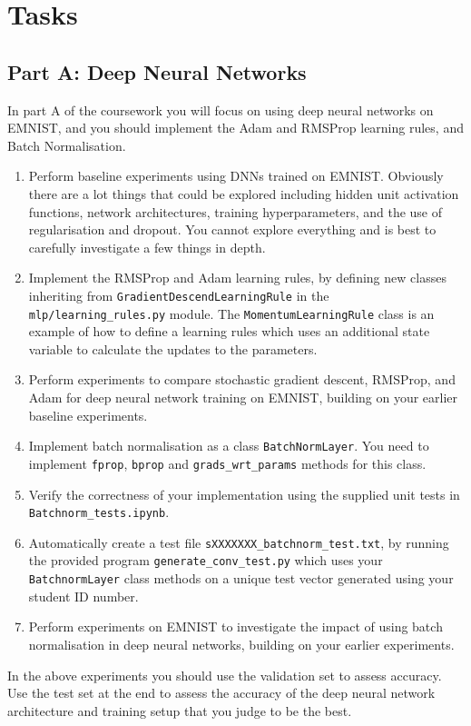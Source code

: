 \documentclass[11pt,]{article}
\begin{document}
\section{Tasks}

\subsection*{Part A: Deep Neural Networks}
In part A of the coursework you will focus on using deep neural networks on EMNIST, and you should implement the Adam and RMSProp learning rules, and Batch Normalisation.
\begin{enumerate}
  \item Perform baseline experiments using DNNs trained on EMNIST.  Obviously there are a lot things that could be explored including hidden unit activation functions, network architectures, training hyperparameters, and the use of regularisation and dropout.   You cannot explore everything and is best to carefully investigate a few things in depth.
  \item Implement the RMSProp \citep{tieleman2012rmsprop} and Adam \citep{kingma2015adam} learning rules, by defining new classes inheriting from \texttt{GradientDescendLearningRule} in the \texttt{mlp/learning\_rules.py} module. The \texttt{MomentumLearningRule} class is an example of how to define  a learning rules which uses an additional state variable to calculate the updates to the parameters.
  \item Perform experiments to compare stochastic gradient descent, RMSProp, and Adam for deep neural network training on EMNIST, building on your earlier baseline experiments.  
  \item Implement batch normalisation \citep{ioffe2015batch} as a class \verb+BatchNormLayer+.  You need to implement \texttt{fprop}, \texttt{bprop} and \texttt{grads\_wrt\_params} methods for this class. 
  \item Verify the correctness of your implementation using the supplied unit tests in \verb+Batchnorm_tests.ipynb+.
  \item Automatically create a test file \verb+sXXXXXXX_batchnorm_test.txt+, by running the provided program \verb+generate_conv_test.py+ which uses your \verb+BatchnormLayer+ class methods on a unique test vector generated using your student ID number.
  \item Perform experiments on EMNIST to investigate the impact of using batch normalisation in deep neural networks, building on your earlier experiments.  
\end{enumerate}
In the above experiments you should use the validation set to assess accuracy.  Use the test set at the end to assess the accuracy of the deep neural network architecture and training setup that you judge to be the best.
\end{document}
